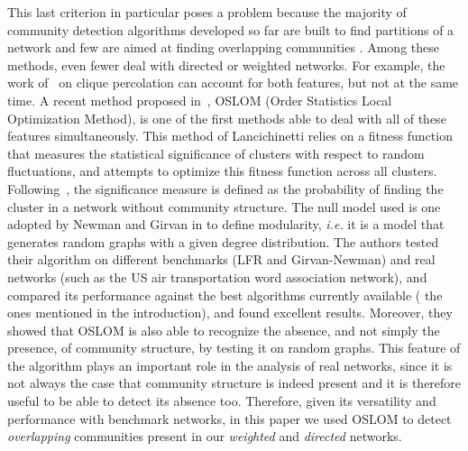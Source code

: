 This last criterion in particular poses a problem because the majority of community detection algorithms developed so far are built to find partitions of a network and few are aimed at finding overlapping communities \cite{Aicher26062014,BaumesGKMP05,PalEtAl05,ZhaWanZha07,Gre07,PhysRevE.77.016107,Lancichinetti2009,PhysRevE.80.016105,Kovacs2010}. Among these methods, even fewer deal with directed or weighted networks. For example, the work of~\cite{PalEtAl05} on clique percolation can account for both features, but not at the same time. A recent method proposed in~\cite{LancichinettiPlos}, OSLOM (Order Statistics Local Optimization Method), is one of the first methods  able to deal with all of these features simultaneously. This method of Lancichinetti \DIFdelbegin {}\DIFdelend \DIFaddbegin \emph{} \DIFaddend relies on a fitness function that measures the statistical significance of clusters with respect to random fluctuations, and attempts to optimize this fitness function across all clusters. 
Following~\cite{LancichinettiPlos}, the significance measure is defined as the probability of finding the cluster in a network without community structure. The null model used is \DIFdelbegin {}\DIFdelend \DIFaddbegin {}\DIFaddend one adopted by Newman and Girvan in \cite{newman2004finding} to define modularity, {\it i.e.\DIFaddbegin \DIFadd{,}\DIFaddend } it is a model that generates random graphs with a given degree distribution. The authors tested their algorithm on different benchmarks (LFR and Girvan-Newman) and real networks (such as the US air transportation \DIFdelbegin {}\DIFdelend \DIFaddbegin {}\DIFaddend word association network), and compared its performance against the best algorithms
currently available ( \DIFaddend the ones mentioned in the introduction), and found excellent results. Moreover, they showed that OSLOM is also able to recognize the absence, and not simply the presence, of community structure, by testing it on random graphs. This feature of the algorithm plays an important role in the analysis of real \DIFdelbegin {}\DIFdelend \DIFaddbegin {}\DIFaddend networks, since it is not always the case that \DIFdelbegin {}\DIFdelend community structure is indeed present and it is therefore useful to be able to detect its absence too. 
Therefore, given its versatility and performance with benchmark networks, in this paper we used OSLOM to detect \emph{overlapping} communities present in our \emph{weighted} and \emph{directed} networks.

